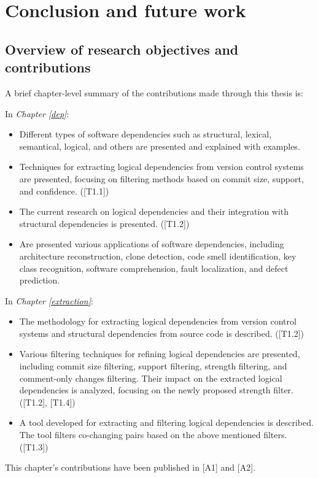 \chapter{Conclusion and future work}

\section{Overview of research objectives and contributions}

\hspace{4em}A brief chapter-level summary of the contributions made through this thesis is:

\noindent In \textit{Chapter \ref{dep}}:
\begin{itemize}
    \item Different types of software dependencies such as structural, lexical, semantical, logical, and others are presented and explained with examples.
    \item Techniques for extracting logical dependencies from version control systems are presented, focusing on filtering methods based on commit size, support, and confidence. \hfill ([T1.1])
    \item The current research on logical dependencies and their integration with structural dependencies is presented. \hfill ([T1.2])
    \item Are presented various applications of software dependencies, including architecture reconstruction, clone detection, code smell identification, key class recognition, software comprehension, fault localization, and defect prediction. 
\end{itemize}

\noindent In \textit{Chapter \ref{extraction}}:
\begin{itemize}
    \item The methodology for extracting logical dependencies from version control systems and structural dependencies from source code is described. \hfill ([T1.2])
    \item Various filtering techniques for refining logical dependencies are presented, including commit size filtering, support filtering, strength filtering, and comment-only changes filtering. Their impact on the extracted logical dependencies is analyzed, focusing on the newly proposed strength filter. \hfill ([T1.2], [T1.4])
    \item A tool developed for extracting and filtering logical dependencies is described. The tool filters co-changing pairs based on the above mentioned filters. \hfill ([T1.3])
\end{itemize}
This chapter's contributions have been published in [A1] and [A2].

